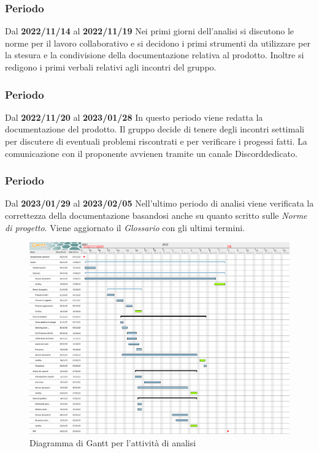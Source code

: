 \subsubsection{ Periodo}
Dal \textbf{2022/11/14} al \textbf{2022/11/19}
\newline
Nei primi giorni dell'analisi si discutono le norme per il lavoro collaborativo e si decidono i primi strumenti da utilizzare per
la stesura e la condivisione della documentazione relativa al prodotto. Inoltre si redigono i primi verbali relativi agli incontri
del gruppo.

\subsubsection{ Periodo} 
Dal \textbf{2022/11/20} al \textbf{2023/01/28}
\newline
In questo periodo viene redatta la documentazione del prodotto. Il gruppo decide di tenere degli incontri settimali per discutere di
eventuali problemi riscontrati e per verificare i progessi fatti. La comunicazione con il proponente avvienen tramite un canale 
Discord\glo dedicato.

\subsubsection{ Periodo} 
Dal \textbf{2023/01/29} al \textbf{2023/02/05}
\newline
Nell'ultimo periodo di analisi viene verificata la correttezza della documentazione basandosi anche su quanto scritto 
sulle \textit{Norme di progetto}. Viene aggiornato il \textit{Glossario} con gli ultimi termini.

\begin{figure}[H]
    \centering
    \includegraphics[scale=0.3]{src/img/Gantt analisi.png}
    \caption{Diagramma di Gantt per l'attività di analisi}
\end{figure}

